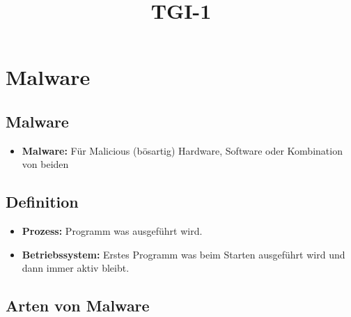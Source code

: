 \documentclass[a4paper,10pt]{scrartcl}
\title{TGI-1}
\author{}
\begin{document}
\section{Malware}

\subsection{Malware}

\begin{itemize}
 \item \textbf{Malware:} Für Malicious (bösartig) Hardware, Software oder Kombination von beiden
\end{itemize}

\subsection{Definition}


\begin{itemize}
 \item \textbf{Prozess:} Programm was ausgeführt wird.
 \item \textbf{Betriebssystem:} Erstes Programm was beim Starten ausgeführt wird und dann immer aktiv bleibt.
\end{itemize}

\subsection{Arten von Malware}
\end{document}
